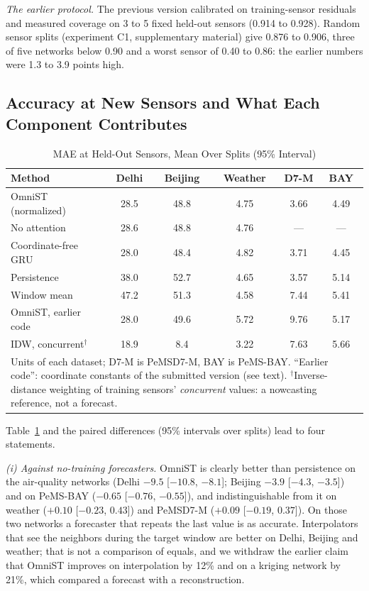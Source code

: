\documentclass[journal,twoside,web]{ieeecolor}
\begin{document}
\emph{The earlier protocol.} The previous version calibrated on training-sensor residuals and measured coverage on 3
to 5 fixed held-out sensors (0.914 to 0.928). Random sensor splits (experiment C1, supplementary material) give
0.876 to 0.906, three of five networks below 0.90 and a worst sensor of 0.40 to 0.86: the earlier numbers were 1.3 to 3.9
points high.

\subsection{Accuracy at New Sensors and What Each Component Contributes}
\label{sec:ablation}

\begin{table}[htbp]
\caption{MAE at Held-Out Sensors, Mean Over Splits (95\% Interval)}
\label{tab:accuracy}
\centering
\footnotesize
\setlength{\tabcolsep}{3.2pt}
\begin{tabular}{lccccc}
\toprule
\textbf{Method} & \textbf{Delhi} & \textbf{Beijing} & \textbf{Weather} & \textbf{D7-M} & \textbf{BAY} \\
\midrule
OmniST (normalized)    & 28.5 & 48.8 & 4.75 & 3.66 & 4.49 \\
No attention           & 28.6 & 48.8 & 4.76 & ---  & ---  \\
Coordinate-free GRU    & 28.0 & 48.4 & 4.82 & 3.71 & 4.45 \\
Persistence            & 38.0 & 52.7 & 4.65 & 3.57 & 5.14 \\
Window mean            & 47.2 & 51.3 & 4.58 & 7.44 & 5.41 \\
OmniST, earlier code   & 28.0 & 49.6 & 5.72 & 9.76 & 5.17 \\
\midrule
IDW, concurrent$^\dagger$ & 18.9 & 8.4 & 3.22 & 7.63 & 5.66 \\
\bottomrule
\multicolumn{6}{p{0.93\columnwidth}}{\footnotesize Units of each dataset; D7-M is PeMSD7-M, BAY is
PeMS-BAY. ``Earlier code'': coordinate constants of the submitted version (see text). $^\dagger$Inverse-distance
weighting of training sensors' \emph{concurrent} values: a nowcasting reference, not a forecast.} \\
\end{tabular}
\end{table}

Table~\ref{tab:accuracy} and the paired differences (95\% intervals over splits) lead to four
statements.

\emph{(i) Against no-training forecasters.} OmniST is clearly better than persistence on the
air-quality networks (Delhi $-9.5$ [$-10.8$, $-8.1$]; Beijing $-3.9$ [$-4.3$, $-3.5$]) and on PeMS-BAY
($-0.65$ [$-0.76$, $-0.55$]), and indistinguishable from it on weather ($+0.10$ [$-0.23$, $0.43$]) and
PeMSD7-M ($+0.09$ [$-0.19$, $0.37$]). On those two networks a forecaster that repeats the last value
is as accurate. Interpolators that see the neighbors during the target window are better on Delhi,
Beijing and weather; that is not a comparison of equals, and we withdraw the earlier claim that OmniST improves on
interpolation by 12\% and on a kriging network by 21\%, which compared a forecast with a reconstruction.
\end{document}
